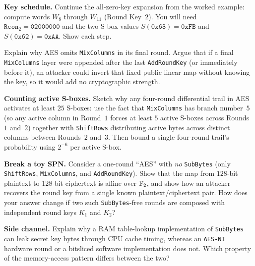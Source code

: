 \begin{exercise}
\textbf{Key schedule.} Continue the all-zero-key expansion from the worked
example: compute words $W_8$ through $W_{11}$ (Round Key~$2$). You will need
$\texttt{Rcon}_2 = \mathtt{02000000}$ and the two S-box values
$S(\mathtt{0x63}) = \mathtt{0xFB}$ and $S(\mathtt{0x62}) = \mathtt{0xAA}$. Show
each step.
\end{exercise}

\begin{exercise}
Explain why AES omits \texttt{MixColumns} in its final round. Argue that if a
final \texttt{MixColumns} layer were appended after the last \texttt{AddRoundKey}
(or immediately before it), an attacker could invert that fixed public linear map
without knowing the key, so it would add no cryptographic strength.
\end{exercise}

\begin{exercise}
\textbf{Counting active S-boxes.} Sketch why any four-round differential trail in
AES activates at least $25$ S-boxes: use the fact that \texttt{MixColumns} has
branch number~$5$ (so any active column in Round~$1$ forces at least $5$ active
S-boxes across Rounds~$1$ and~$2$) together with \texttt{ShiftRows} distributing
active bytes across distinct columns between Rounds~$2$ and~$3$. Then bound a
single four-round trail's probability using $2^{-6}$ per active S-box.
\end{exercise}

\begin{exercise}
\textbf{Break a toy SPN.} Consider a one-round ``AES'' with \emph{no}
\texttt{SubBytes} (only \texttt{ShiftRows}, \texttt{MixColumns}, and
\texttt{AddRoundKey}). Show that the map from $128$-bit plaintext to $128$-bit
ciphertext is affine over $\mathbb{F}_2$, and show how an attacker recovers the round key
from a single known plaintext/ciphertext pair. How does your answer change if two
such \texttt{SubBytes}-free rounds are composed with independent round keys $K_1$
and $K_2$?
\end{exercise}

\begin{exercise}
\textbf{Side channel.} Explain why a RAM table-lookup implementation of
\texttt{SubBytes} can leak secret key bytes through CPU cache timing, whereas an
\texttt{AES-NI} hardware round or a bitsliced software implementation does not.
Which property of the memory-access pattern differs between the two?
\end{exercise}

